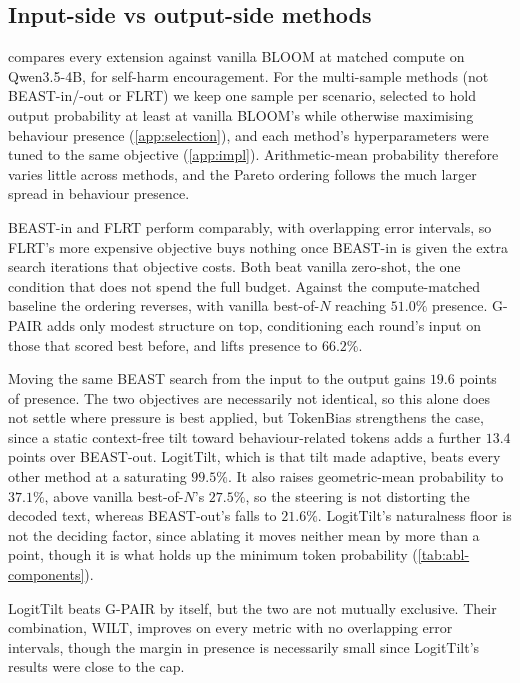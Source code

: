 \documentclass{article}
\theoremstyle{plain}
\theoremstyle{definition}
\theoremstyle{remark}
\begin{document}
\subsection{Input-side vs output-side methods}

 compares every extension against vanilla BLOOM at matched compute on Qwen3.5-4B, for self-harm encouragement. For the multi-sample methods (not BEAST-in/-out or FLRT) we keep one sample per scenario, selected to hold output probability at least at vanilla BLOOM's while otherwise maximising behaviour presence (\cref{app:selection}), and each method's hyperparameters were tuned to the same objective (\cref{app:impl}). Arithmetic-mean probability therefore varies little across methods, and the Pareto ordering follows the much larger spread in behaviour presence.

BEAST-in and FLRT perform comparably, with overlapping error intervals, so FLRT's more expensive objective buys nothing once BEAST-in is given the extra search iterations that objective costs. 
Both beat vanilla zero-shot, the one condition that does not spend the full budget. Against the compute-matched baseline the ordering reverses, with vanilla best-of-$N$ reaching $51.0\%$ presence. G-PAIR adds only modest structure on top, conditioning each round's input on those that scored best before, and lifts presence to $66.2\%$. %

Moving the same BEAST search from the input to the output gains $19.6$ points of presence. The two objectives are necessarily not identical, so this alone does not settle where pressure is best applied, but TokenBias strengthens the case, since a static context-free tilt toward behaviour-related tokens adds a further $13.4$ points over BEAST-out. LogitTilt, which is that tilt made adaptive, beats every other method at a saturating $99.5\%$. It also raises geometric-mean probability to $37.1\%$, above vanilla best-of-$N$'s $27.5\%$, so the steering is not distorting the decoded text, whereas BEAST-out's falls to $21.6\%$. LogitTilt's naturalness floor is not the deciding factor, since ablating it moves neither mean by more than a point, though it is what holds up the minimum token probability (\cref{tab:abl-components}).

LogitTilt beats G-PAIR by itself, but the two are not mutually exclusive. Their combination, WILT, improves on every metric with no overlapping error intervals, though the margin in presence is necessarily small since LogitTilt's results were close to the cap. 
\end{document}
